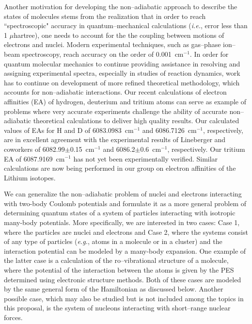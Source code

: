 Another motivation for developing the non--adiabatic approach to 
describe the states of molecules stems from the realization that
in order to reach ``spectroscopic" accuracy in quantum--mechanical
calculations ({\it i.e.}, error less than 1 $\mu$hartree), one needs
to account for the the coupling between
motions of electrons and nuclei. Modern experimental techniques,
such as gas--phase ion--beam spectroscopy, reach accuracy on the
order of 0.001~cm$^{-1}$. \cite{C} In order for quantum molecular mechanics
to continue providing assistance in resolving and assigning
experimental spectra, especially in studies of reaction dynamics,
work has to continue on development of more refined theoretical 
methodology, which accounts for non--adiabatic interactions.
Our recent calculations of electron affinities (EA) of hydrogen, deuterium
and tritium atoms \cite{A37} can serve as example of 
problems where very accurate experiments challenge the ability
of accurate non--adiabatic theoretical calculations 
to deliver high quality results.
Our calculated values of EAs for H and D of 6083.0983~cm$^{-1}$
and 6086.7126~cm$^{-1}$, respectively, are in excellent
agreement with the experimental results of Lineberger and
coworkers of 6082.99$\pm$0.15~cm$^{-1}$ and 6086.2$\pm$0.6~cm$^{-1}$,
respectively. Our tritium EA of 6087.9169~cm$^{-1}$ has not yet 
been experimentally verified. Similar calculations are now being
performed in our group 
on electron affinities of the Lithium isotopes.

We can generalize the non--adiabatic problem of nuclei and electrons
interacting with two-body Coulomb potentials
and formulate it as a more general problem of determining  
quantum states
of a system of particles interacting with 
isotropic many-body potentials. More
specifically, we are interested in two cases: 
Case 1, where the
particles are nuclei and electrons 
and
Case 2, where the systems consist of any type of particles
({\it e.g.}, atoms in a molecule or in a cluster)
and the interaction potential can be modeled by a
many-body expansion.
One example of the latter case is a calculation of the ro--vibrational
structure of a molecule, where the potential 
of the interaction between the atoms
is given by the PES determined using electronic structure
methods.
Both of these cases are modeled by the same general form of
the Hamiltonian as discussed below.
Another possible case, which may also be studied but is 
not included among the topics in this proposal, is the system
of nucleons interacting with short--range nuclear forces.

